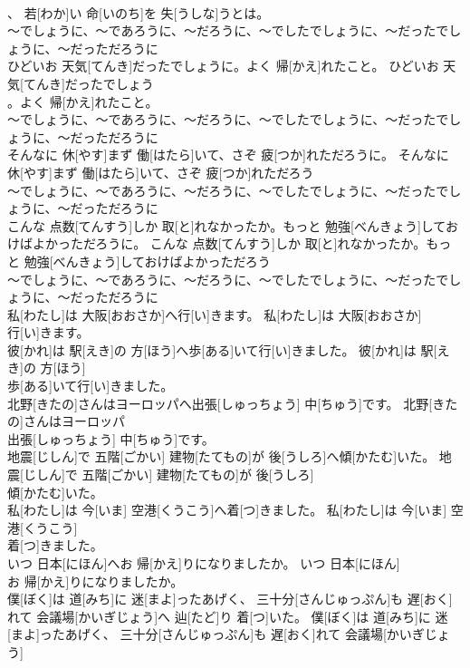 \documentclass[8pt]{extreport}
\begin{document}
\begin{CJK}{UTF8}{min}
\\	、 若[わか]い 命[いのち]を 失[うしな]うとは。	
\\	～でしょうに、～であろうに、～だろうに、～でしたでしょうに、～だったでしょうに、～だっただろうに
\\	ひどいお 天気[てんき]だったでしょうに。よく 帰[かえ]れたこと。	ひどいお 天気[てんき]だったでしょう
\\	。よく 帰[かえ]れたこと。	
\\	～でしょうに、～であろうに、～だろうに、～でしたでしょうに、～だったでしょうに、～だっただろうに
\\	そんなに 休[やす]まず 働[はたら]いて、さぞ 疲[つか]れただろうに。	そんなに 休[やす]まず 働[はたら]いて、さぞ 疲[つか]れただろう
\\	～でしょうに、～であろうに、～だろうに、～でしたでしょうに、～だったでしょうに、～だっただろうに
\\	こんな 点数[てんすう]しか 取[と]れなかったか。もっと 勉強[べんきょう]しておけばよかっただろうに。	こんな 点数[てんすう]しか 取[と]れなかったか。もっと 勉強[べんきょう]しておけばよかっただろう
\\	～でしょうに、～であろうに、～だろうに、～でしたでしょうに、～だったでしょうに、～だっただろうに
\\	私[わたし]は 大阪[おおさか]へ行[い]きます。	私[わたし]は 大阪[おおさか]
\\	行[い]きます。	
\\	彼[かれ]は 駅[えき]の 方[ほう]へ歩[ある]いて行[い]きました。	彼[かれ]は 駅[えき]の 方[ほう]
\\	歩[ある]いて行[い]きました。	
\\	北野[きたの]さんはヨーロッパへ出張[しゅっちょう] 中[ちゅう]です。	北野[きたの]さんはヨーロッパ
\\	出張[しゅっちょう] 中[ちゅう]です。	
\\	地震[じしん]で 五階[ごかい] 建物[たてもの]が 後[うしろ]へ傾[かたむ]いた。	地震[じしん]で 五階[ごかい] 建物[たてもの]が 後[うしろ]
\\	傾[かたむ]いた。	
\\	私[わたし]は 今[いま] 空港[くうこう]へ着[つ]きました。	私[わたし]は 今[いま] 空港[くうこう]
\\	着[つ]きました。	
\\	いつ 日本[にほん]へお 帰[かえ]りになりましたか。	いつ 日本[にほん]
\\	お 帰[かえ]りになりましたか。	
\\	僕[ぼく]は 道[みち]に 迷[まよ]ったあげく、 三十分[さんじゅっぷん]も 遅[おく]れて 会議場[かいぎじょう]へ 辿[たど]り 着[つ]いた。	僕[ぼく]は 道[みち]に 迷[まよ]ったあげく、 三十分[さんじゅっぷん]も 遅[おく]れて 会議場[かいぎじょう]

\end{CJK}
\end{document}
